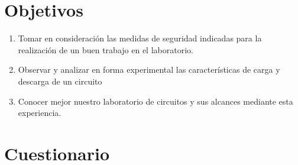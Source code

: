 \documentclass[a4paper,12pt]{report}
\begin{document}
\chapter{Objetivos}
\begin{enumerate}
\item Tomar en consideración las medidas de seguridad indicadas para la realización de un buen trabajo en el laboratorio.
\item Observar y analizar en forma experimental las características de carga y descarga de un circuito
\item Conocer mejor nuestro laboratorio de circuitos y sus alcances mediante esta experiencia.
\end{enumerate}
\chapter{Cuestionario}
\end{document}
